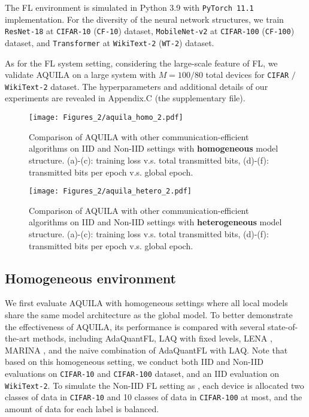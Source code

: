 \documentclass[lettersize,journal]{IEEEtran}
\begin{document}
The FL environment is simulated in Python 3.9 with \texttt{PyTorch 11.1} \cite{paszke2019pytorch} implementation. For the diversity of the neural network structures, we train \texttt{ResNet-18} \cite{he2016deep} at \texttt{CIFAR-10} (\texttt{CF-10}) dataset, \texttt{MobileNet-v2} \cite{sandler2018mobilenetv2} at \texttt{CIFAR-100} (\texttt{CF-100}) dataset, and \texttt{Transformer} \cite{vaswani2017attention} at \texttt{WikiText-2} (\texttt{WT-2}) dataset. 

As for the FL system setting, considering the large-scale feature of FL, we validate AQUILA on a large system with $M=100/80$ total devices for \texttt{CIFAR} $/$ \texttt{WikiText-2} dataset. The hyperparameters and additional details of our experiments are revealed in Appendix.C (the supplementary file).

\begin{figure*}[htbp]
    \centering
    \texttt{[image: Figures\_2/aquila\_homo\_2.pdf]}
    \vspace{-8pt}
    \caption{Comparison of AQUILA with other communication-efficient algorithms on IID and Non-IID settings with \textbf{homogeneous} model structure. (a)-(c): training loss v.s. total transmitted bits, (d)-(f): transmitted bits per epoch v.s. global epoch.}
    \label{homo_fig}
\end{figure*}

\begin{figure*}[htbp]
    \centering
    \texttt{[image: Figures\_2/aquila\_hetero\_2.pdf]}
    \vspace{-8pt}
    \caption{Comparison of AQUILA with other communication-efficient algorithms on IID and Non-IID settings with \textbf{heterogeneous} model structure. (a)-(c): training loss v.s. total transmitted bits, (d)-(f): transmitted bits per epoch v.s. global epoch.}
    \label{hetero_fig}
\end{figure*}


\subsection{Homogeneous environment}

We first evaluate AQUILA with homogeneous settings where all local models share the same model architecture as the global model. To better demonstrate the effectiveness of AQUILA, its performance is compared with several state-of-the-art methods, including AdaQuantFL, LAQ with fixed levels, LENA \cite{ghadikolaei2021lena}, MARINA \cite{gorbunov2021marina}, and the naive combination of AdaQuantFL with LAQ. Note that based on this homogeneous setting, we conduct both IID and Non-IID evaluations on \texttt{CIFAR-10} and \texttt{CIFAR-100} dataset, and an IID evaluation on \texttt{WikiText-2}. To simulate the Non-IID FL setting as \cite{diao2020heterofl}, each device is allocated two classes of data in \texttt{CIFAR-10} and 10 classes of data in \texttt{CIFAR-100} at most, and the amount of data for each label is balanced.
\end{document}
